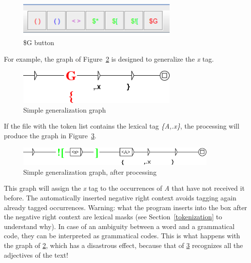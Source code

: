 \begin{figure}[!htb]
  \centering
  \includegraphics[width=8cm]{resources/img/bouton_g.png}
  \caption{\$G button}
  \label{fig:bouton_g}
\end{figure}

\bigskip
\noindent For example, the graph of
Figure~\ref{fig:graphe_gener_simple} is designed to generalize the \textit{x} tag.

\begin{figure}[!htb]
  \centering
  \includegraphics[width=8cm]{resources/img/graphe_generique_simple.png}
  \caption{Simple generalization graph}
  \label{fig:graphe_gener_simple}
\end{figure}

\bigskip
\noindent If the file with the token list contains the lexical tag \emph{\{A,.x\}}, the processing
will produce the graph in Figure~\ref{fig:graphe_gener_simple_genere}.

\begin{figure}[!htb]
  \centering
  \includegraphics[width=10cm]{resources/img/graphe_generique_simple_genere.png}
  \caption{Simple generalization graph, after processing}
  \label{fig:graphe_gener_simple_genere}
\end{figure}

\bigskip
\noindent This graph will assign the \textit{x} tag to the occurrences of \emph{A} that have not received it before.
The automatically inserted negative right
context avoids tagging again already tagged occurrences. Warning:
what the program inserts into the box after the negative right context are lexical masks (see
Section~\ref{tokenization} to understand why). In case of an ambiguity between a word and a grammatical code,
they can be interpreted as grammatical codes. This is what happens with the graph
of \ref{fig:graphe_gener_simple}, which has a disastrous effect, because that of
\ref{fig:graphe_gener_simple_genere} recognizes
all the adjectives of the text!

